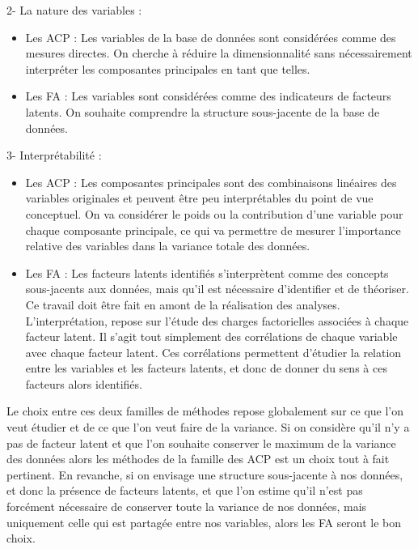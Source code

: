 \documentclass[
  french,
  11pt,
  a4paper,
]{article}
\providecommand{\tightlist}{%
  \setlength{\itemsep}{0pt}\setlength{\parskip}{0pt}}
\begin{document}
2- La nature des variables :

\begin{itemize}
\tightlist
\item
  Les ACP : Les variables de la base de données sont considérées comme
  des mesures directes. On cherche à réduire la dimensionnalité sans
  nécessairement interpréter les composantes principales en tant que
  telles.
\item
  Les FA : Les variables sont considérées comme des indicateurs de
  facteurs latents. On souhaite comprendre la structure sous-jacente de
  la base de données.
\end{itemize}

3- Interprétabilité :

\begin{itemize}
\tightlist
\item
  Les ACP : Les composantes principales sont des combinaisons linéaires
  des variables originales et peuvent être peu interprétables du point
  de vue conceptuel. On va considérer le poids ou la contribution d'une
  variable pour chaque composante principale, ce qui va permettre de
  mesurer l'importance relative des variables dans la variance totale
  des données.
\item
  Les FA : Les facteurs latents identifiés s'interprètent comme des
  concepts sous-jacents aux données, mais qu'il est nécessaire
  d'identifier et de théoriser. Ce travail doit être fait en amont de la
  réalisation des analyses. L'interprétation, repose sur l'étude des
  charges factorielles associées à chaque facteur latent. Il s'agit tout
  simplement des corrélations de chaque variable avec chaque facteur
  latent. Ces corrélations permettent d'étudier la relation entre les
  variables et les facteurs latents, et donc de donner du sens à ces
  facteurs alors identifiés.
\end{itemize}

Le choix entre ces deux familles de méthodes repose globalement sur ce
que l'on veut étudier et de ce que l'on veut faire de la variance. Si on
considère qu'il n'y a pas de facteur latent et que l'on souhaite
conserver le maximum de la variance des données alors les méthodes de la
famille des ACP est un choix tout à fait pertinent. En revanche, si on
envisage une structure sous-jacente à nos données, et donc la présence
de facteurs latents, et que l'on estime qu'il n'est pas forcément
nécessaire de conserver toute la variance de nos données, mais
uniquement celle qui est partagée entre nos variables, alors les FA
seront le bon choix.
\end{document}
